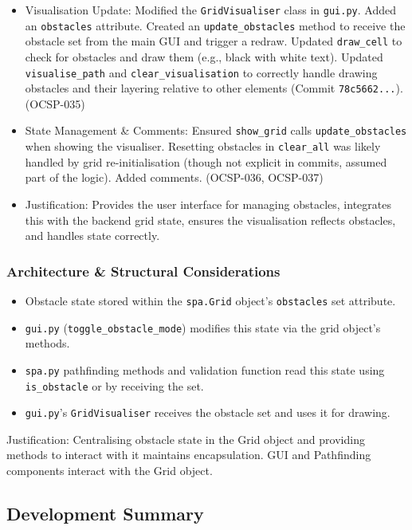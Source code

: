 \begin{enumerate}
\begin{itemize}
        \item Visualisation Update: Modified the \verb|GridVisualiser| class in \verb|gui.py|. Added an \verb|obstacles| attribute. Created an \verb|update_obstacles| method to receive the obstacle set from the main GUI and trigger a redraw. Updated \verb|draw_cell| to check for obstacles and draw them (e.g., black with white text). Updated \verb|visualise_path| and \verb|clear_visualisation| to correctly handle drawing obstacles and their layering relative to other elements (Commit \verb|78c5662...|). (OCSP-035)
        \item State Management & Comments: Ensured \verb|show_grid| calls \verb|update_obstacles| when showing the visualiser. Resetting obstacles in \verb|clear_all| was likely handled by grid re-initialisation (though not explicit in commits, assumed part of the logic). Added comments. (OCSP-036, OCSP-037)
        \item Justification: Provides the user interface for managing obstacles, integrates this with the backend grid state, ensures the visualisation reflects obstacles, and handles state correctly.
    \end{itemize}
\end{enumerate}

\subsubsection{Architecture \& Structural Considerations}
\begin{itemize}
	\item Obstacle state stored within the \verb|spa.Grid| object's \verb|obstacles| set attribute.
	\item \verb|gui.py| (\verb|toggle_obstacle_mode|) modifies this state via the grid object's methods.
	\item \verb|spa.py| pathfinding methods and validation function read this state using \verb|is_obstacle| or by receiving the set.
	\item \verb|gui.py|'s \verb|GridVisualiser| receives the obstacle set and uses it for drawing.
\end{itemize}
Justification: Centralising obstacle state in the Grid object and providing methods to interact with it maintains encapsulation. GUI and Pathfinding components interact with the Grid object.

\newpage
\subsection{Development Summary}

